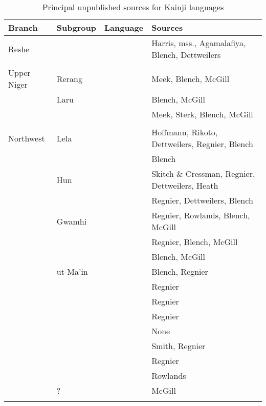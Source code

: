 \documentclass[output=paper]{langsci/langscibook}
\begin{document}
\begin{table}
\small
\caption{\label{tab:kainji:26a} Principal unpublished sources for Kainji languages}


\begin{tabularx}{\textwidth}{lllQ}
\lsptoprule
Branch  & Subgroup &  Language &    Sources\\
\midrule
Reshe	& 	& 	& Harris, mss., Agamalafiya, Blench,  Dettweilers\\
	& 	& 	& \\
Upper Niger	& Rerang	& 	& Meek, Blench, McGill\\
	& Laru	& 	& Blench, McGill\\
	& 	& 	& Meek, Sterk, Blench, McGill\\
	& 	& 	& \\
Northwest	& Lela	& 	& Hoffmann, Rikoto,  Dettweilers, Regnier, Blench\\
	& 	& 	& Blench\\
	& Hun	& 	& Skitch \& Cressman, Regnier,  Dettweilers, Heath\\
	& 	& 	& Regnier,  Dettweilers, Blench\\
% 
	& Gwamhi	& 	& Regnier, Rowlands, Blench, McGill\\
	& 	& 	& Regnier, Blench, McGill\\
	& 	&  	& Blench, McGill\\
	& ut-Ma’in	& 	& Blench, Regnier\\
	& 	& 	& Regnier\\
	& 	& 	& Regnier\\
	& 	& 	& Regnier\\
	& 	& 	& None\\
	& 	&  	& Smith, Regnier\\
	& 	& 	& Regnier\\
	& 	& 	& Rowlands\\
	& ?	& 	& McGill\\
\lspbottomrule
\end{tabularx}
\end{table}
\end{document}
